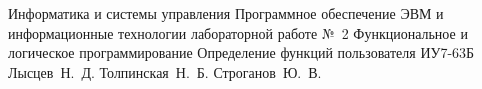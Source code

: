 \documentclass{bmstu}
\begin{document}
\makereporttitle
{Информатика и системы управления} %
{Программное обеспечение ЭВМ и информационные технологии}
{лабораторной работе №~2} %
{Функциональное и логическое программирование} %
{Определение функций пользователя} %
{} %
{ИУ7-63Б} %
{Лысцев~Н.~Д.} %
{Толпинская~Н.~Б. Строганов~Ю.~В.}


%

%
%
%

\end{document}
